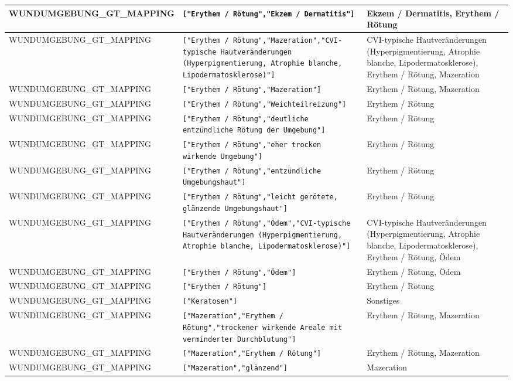 \begin{longtable}{|p{3.5cm}|p{5cm}|p{6.5cm}|}
WUNDUMGEBUNG\_GT\_MAPPING & \texttt{["Erythem / Rötung","Ekzem / Dermatitis"]} & Ekzem / Dermatitis, Erythem / Rötung \\ \hline
WUNDUMGEBUNG\_GT\_MAPPING & \texttt{["Erythem / Rötung","Mazeration","CVI-typische Hautveränderungen (Hyperpigmentierung, Atrophie blanche, Lipodermatosklerose)"]} & CVI-typische Hautveränderungen (Hyperpigmentierung, Atrophie blanche, Lipodermatosklerose), Erythem / Rötung, Mazeration \\ \hline
WUNDUMGEBUNG\_GT\_MAPPING & \texttt{["Erythem / Rötung","Mazeration"]} & Erythem / Rötung, Mazeration \\ \hline
WUNDUMGEBUNG\_GT\_MAPPING & \texttt{["Erythem / Rötung","Weichteilreizung"]} & Erythem / Rötung \\ \hline
WUNDUMGEBUNG\_GT\_MAPPING & \texttt{["Erythem / Rötung","deutliche entzündliche Rötung der Umgebung"]} & Erythem / Rötung \\ \hline
WUNDUMGEBUNG\_GT\_MAPPING & \texttt{["Erythem / Rötung","eher trocken wirkende Umgebung"]} & Erythem / Rötung \\ \hline
WUNDUMGEBUNG\_GT\_MAPPING & \texttt{["Erythem / Rötung","entzündliche Umgebungshaut"]} & Erythem / Rötung \\ \hline
WUNDUMGEBUNG\_GT\_MAPPING & \texttt{["Erythem / Rötung","leicht gerötete, glänzende Umgebungshaut"]} & Erythem / Rötung \\ \hline
WUNDUMGEBUNG\_GT\_MAPPING & \texttt{["Erythem / Rötung","Ödem","CVI-typische Hautveränderungen (Hyperpigmentierung, Atrophie blanche, Lipodermatosklerose)"]} & CVI-typische Hautveränderungen (Hyperpigmentierung, Atrophie blanche, Lipodermatosklerose), Erythem / Rötung, Ödem \\ \hline
WUNDUMGEBUNG\_GT\_MAPPING & \texttt{["Erythem / Rötung","Ödem"]} & Erythem / Rötung, Ödem \\ \hline
WUNDUMGEBUNG\_GT\_MAPPING & \texttt{["Erythem / Rötung"]} & Erythem / Rötung \\ \hline
WUNDUMGEBUNG\_GT\_MAPPING & \texttt{["Keratosen"]} & Sonstiges \\ \hline
WUNDUMGEBUNG\_GT\_MAPPING & \texttt{["Mazeration","Erythem / Rötung","trockener wirkende Areale mit verminderter Durchblutung"]} & Erythem / Rötung, Mazeration \\ \hline
WUNDUMGEBUNG\_GT\_MAPPING & \texttt{["Mazeration","Erythem / Rötung"]} & Erythem / Rötung, Mazeration \\ \hline
WUNDUMGEBUNG\_GT\_MAPPING & \texttt{["Mazeration","glänzend"]} & Mazeration \\ \hline

\end{longtable}
